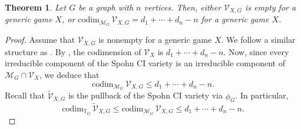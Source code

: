 \documentclass[11pt]{amsart}
\numberwithin{equation}{section}
\theoremstyle{plain}
\newtheorem{theorem}{Theorem}
\numberwithin{theorem}{section}
\theoremstyle{definition}
\begin{document}
\begin{theorem}\label{theo:dimension}
Let $G$ be a graph with $n$ vertices. Then, either $\mathcal{V}_{X,G}$ is empty for a generic game $X$, or $\mathrm{codim}_{\mathcal{M}_G}\,\mathcal{V}_{X,G} = d_1+\cdots+d_n-n$ for a generic game $X$.
\end{theorem}
\begin{proof}
Assume that  $\mathcal{V}_{X,G}$ is nonempty for a generic game $X$.
We follow a similar structure as \cite[Theorem 9]{portakal2024game}.
By \cite[Theorem 6]{portakal2022geometry}, the codimension of $\mathcal{V}_{X}$ is $d_1+\cdots+d_n-n$. Now, since
every irreducible component of the Spohn CI variety is an irreducible component of $\mathcal{M}_G\cap \mathcal{V}_{X}$, we deduce that
\[
\mathrm{codim}_{\mathcal{M}_G}\,\mathcal{V}_{X,G} \leq d_1+\cdots + d_n-n.
\]
Recall that $\widetilde{\mathcal{V}}_{X,G}$ is the pullback of the Spohn CI variety via $\phi_G$. In particular, 
\[
\mathrm{codim}_{\mathbb{T}_G}\,\widetilde{\mathcal{V}}_{X,G}\leq\mathrm{codim}_{\mathcal{M}_G}\,\mathcal{V}_{X,G} \leq d_1+\cdots + d_n-n.
\]


\end{proof}
\end{document}
